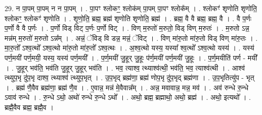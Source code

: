 \documentclass[17pt]{extarticle}
\begin{document}
29. न पा॒पम् पा॒पम् न न पा॒पम् । . पा॒पꣳ श्लोकꣳ॒॒ श्लोक॑म् पा॒पम् पा॒पꣳ श्लोक᳚म् । . श्लोकꣳ॑ शृणोति शृणोति॒ श्लोकꣳ॒॒ श्लोकꣳ॑ शृणोति । . शृ॒णो॒ति॒ ब्रह्म॒ ब्रह्म॑ शृणोति शृणोति॒ ब्रह्म॑ । . ब्रह्म॒ वै वै ब्रह्म॒ ब्रह्म॒ वै । . वै प॒र्णः प॒र्णो वै वै प॒र्णः । . प॒र्णो विड् विट् प॒र्णः प॒र्णो विट् । . विण् म॒रुतो॑ म॒रुतो॒ विड् विण् म॒रुतः॑ । . म॒रुतो ऽन्न॒ मन्न॑म् म॒रुतो॑ म॒रुतो ऽन्न᳚म् । . अन्नं॒ ॅविड् वि डन्न॒ मन्नं॒ ॅविट् । . विण् मा॑रु॒तो मा॑रु॒तो विड् विण् मा॑रु॒तः । . मा॒रु॒तो᳚ ऽश्व॒त्थो᳚ ऽश्व॒त्थो मा॑रु॒तो मा॑रु॒तो᳚ ऽश्व॒त्थः । . अ॒श्व॒त्थो यस्य॒ यस्या᳚ श्व॒त्थो᳚ ऽश्व॒त्थो यस्य॑ । . यस्य॑ पर्ण॒मयी॑ पर्ण॒मयी॒ यस्य॒ यस्य॑ पर्ण॒मयी᳚ । . प॒र्ण॒मयी॑ जु॒हूर् जु॒हूः प॑र्ण॒मयी॑ पर्ण॒मयी॑ जु॒हूः । . प॒र्ण॒मयीति॑ पर्ण - मयी᳚ । . जु॒हूर् भव॑ति॒ भव॑ति जु॒हूर् जु॒हूर् भव॑ति । . भव॒ त्याश्व॒ त्थ्याश्व॑त्थी॒ भव॑ति॒ भव॒ त्याश्व॑त्थी । . आश्व॑ त्थ्युप॒भृ दु॑प॒भृ दाश्व॒ त्थ्याश्व॑ त्थ्युप॒भृत् । . उ॒प॒भृद् ब्रह्म॑णा॒ ब्रह्म॑ णोप॒भृ दु॑प॒भृद् ब्रह्म॑णा । . उ॒प॒भृतित्यु॑प - भृत् । . ब्रह्म॑ णै॒वैव ब्रह्म॑णा॒ ब्रह्म॑ णै॒व । . ए॒वान्न॒ मन्न॑ मे॒वैवान्न᳚म् । . अन्न॒ मवावान्न॒ मन्न॒ मव॑ । . अव॑ रुन्धे रु॒न्धे ऽवाव॑ रुन्धे । . रु॒न्धे ऽथो॒ अथो॑ रुन्धे रु॒न्धे ऽथो᳚ । . अथो॒ ब्रह्म॒ ब्रह्माथो॒ अथो॒ ब्रह्म॑ । . अथो॒ इत्यथो᳚ । . ब्रह्मै॒वैव ब्रह्म॒ ब्रह्मै॒व । \newline
\end{document}
